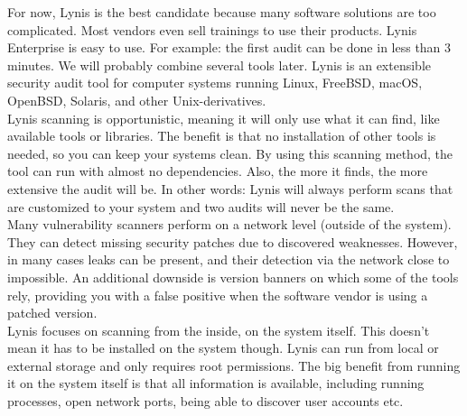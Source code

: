 For now, Lynis is the best candidate because many software solutions are too complicated. Most vendors even sell trainings to use their products.
Lynis Enterprise is easy to use. For example: the first audit can be done in less than 3 minutes. We will probably combine several tools later.
Lynis is an extensible security audit tool for computer systems
running Linux, FreeBSD, macOS, OpenBSD, Solaris, and other
Unix-derivatives.
\\

Lynis scanning is opportunistic, meaning it will only use what it can find, like available tools or libraries. The benefit is that no installation of other tools is needed, so you can keep your systems clean.
By using this scanning method, the tool can run with almost no dependencies. Also, the more it finds, the more extensive the audit will be. In other words: Lynis will always perform scans that are customized to your system and two audits will never be the same.
\\

Many vulnerability scanners perform on a network level (outside of the system). They can detect missing security patches due to discovered weaknesses. However, in many cases leaks can be present, and their detection via the network close to impossible. An additional downside is version banners on which some of the tools rely, providing you with a false positive when the software vendor is using a patched version.
\\

Lynis focuses on scanning from the inside, on the system itself. This doesn’t mean it has to be installed on the system though. Lynis can run from local or external storage and only requires root permissions. The big benefit from running it on the system itself is that all information is available, including running processes, open network ports, being able to discover user accounts etc.

